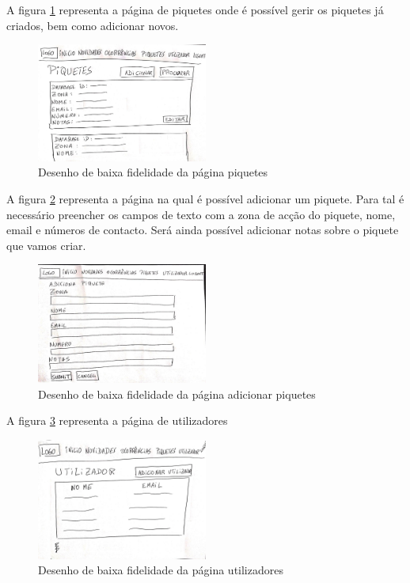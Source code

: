 \FloatBarrier
A figura \ref{fig:piquetes} representa a página de piquetes onde é possível gerir os piquetes já criados, bem como adicionar novos.
\begin{figure}[!htb]
	\centering
	\includegraphics[width=0.5\textwidth, frame]{figuras/storyboard/frame_6.jpg}
	\caption{Desenho de baixa fidelidade da página piquetes}
	\label{fig:piquetes}
\end{figure}

\FloatBarrier
A figura \ref{fig:adicionar_piquetes} representa a página na qual é possível adicionar um piquete. Para tal é necessário preencher os campos de texto com a zona de acção do piquete, nome, email e números de contacto. Será ainda possível adicionar notas sobre o piquete que vamos criar.
\begin{figure}[!htb]
	\centering
	\includegraphics[width=0.5\textwidth, frame]{figuras/storyboard/frame_7.jpg}
	\caption{Desenho de baixa fidelidade da página adicionar piquetes}
	\label{fig:adicionar_piquetes}
\end{figure}

\FloatBarrier
A figura \ref{fig:utilizadores} representa a página de utilizadores
\begin{figure}[!htb]
	\centering
	\includegraphics[width=0.5\textwidth, frame]{figuras/storyboard/frame_8.jpg}
	\caption{Desenho de baixa fidelidade da página utilizadores}
	\label{fig:utilizadores}
\end{figure}

